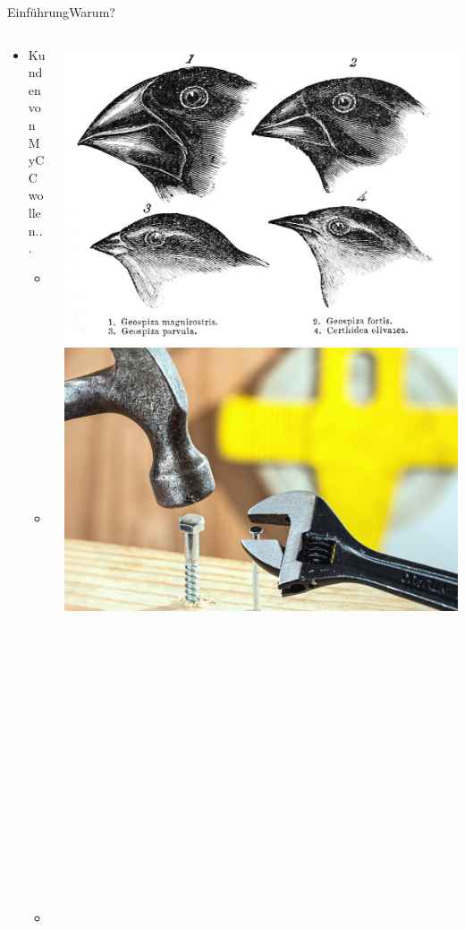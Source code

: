 \documentclass[t,aspectratio=169,divpsnames]{beamer}
\begin{document}
\begin{frame}{Einführung}{Warum?}
	\begin{columns}
		\begin{column}{0.5\textwidth}
			\begin{itemize}
				\item<1-> Kunden von MyCC wollen...
				\begin{itemize}
					\item<2-> Anpassbarkeit 
					\item<3-> Benutzerfreundlichkeit
					\item<4-> Funktionsumfang
				\end{itemize}
			\end{itemize}
		\end{column}
		\begin{column}{0.5\textwidth}
			\only<2>
			{
				\center
				\includegraphics[width=\textwidth]{img/Anpassbarkeit.jpg}
			}
			\only<3>
			{
				\center
				\includegraphics[width=\textwidth]{img/Benutzerfreundlichkeit.jpg}
}
\end{column}
\end{columns}
\end{frame}
\end{document}
